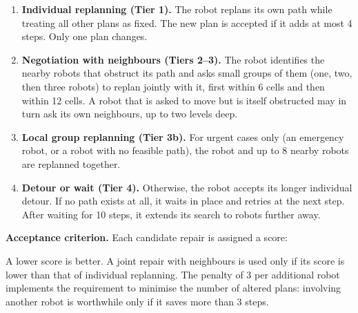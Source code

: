 \documentclass[11pt,a4paper]{article}
\begin{document}
\begin{enumerate}\setlength{\itemsep}{2pt}
  \item \textbf{Individual replanning (Tier 1).} The robot replans its own path while treating
        all other plans as fixed. The new plan is accepted if it adds at most 4 steps. Only one
        plan changes.
  \item \textbf{Negotiation with neighbours (Tiers 2--3).} The robot identifies the nearby robots
        that obstruct its path and asks small groups of them (one, two, then three robots) to
        replan jointly with it, first within 6 cells and then within 12 cells. A robot that is
        asked to move but is itself obstructed may in turn ask its own neighbours, up to two
        levels deep.
  \item \textbf{Local group replanning (Tier 3b).} For urgent cases only (an emergency robot, or a
        robot with no feasible path), the robot and up to 8 nearby robots are replanned together.
  \item \textbf{Detour or wait (Tier 4).} Otherwise, the robot accepts its longer individual
        detour. If no path exists at all, it waits in place and retries at the next step. After
        waiting for 10 steps, it extends its search to robots further away.
\end{enumerate}

\textbf{Acceptance criterion.} Each candidate repair is assigned a score:
\begin{center}
\end{center}
A lower score is better. A joint repair with neighbours is used only if its score is lower than
that of individual replanning. The penalty of 3 per additional robot implements the requirement
to minimise the number of altered plans: involving another robot is worthwhile only if it saves
more than 3 steps.
\end{document}
